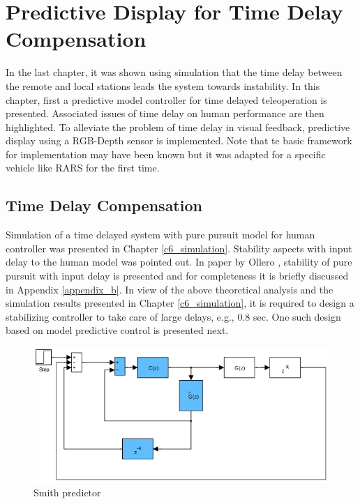 \chapter{ Predictive Display for Time Delay Compensation}
\label{ch_7:PDsply}
In the last chapter, it was shown using simulation that the time delay between the remote and local stations leads the system towards instability. In this chapter, first a predictive model controller for time delayed teleoperation is presented. Associated issues of time delay on human performance are then highlighted. To alleviate the problem of time delay in visual feedback, predictive display using a RGB-Depth sensor is  implemented. Note that te basic framework for implementation may have been known but it was adapted for a specific vehicle like RARS for the first time. 

\section {Time Delay Compensation}
Simulation of a time delayed system with pure pursuit model for human controller was presented in Chapter \ref{c6_simulation}.  Stability aspects with input delay to the human model was pointed out. In paper by Ollero \cite{ollero1995stability}, stability of pure pursuit with input delay is presented and for completeness it is briefly discussed in Appendix \ref{appendix_b}.   In view of the above theoretical analysis and the simulation results presented in Chapter \ref{c6_simulation}, it is required to design  a stabilizing controller to take care of large delays, e.g.,  0.8 sec. One such design based on model  predictive control is presented next.

 \begin{figure}
 	\includegraphics[width=\linewidth]{Chapter7/fig/Smith_predictor}
 	\caption{Smith predictor \cite{smith1959controller}}
 	\label{fig:Smith}
 \end{figure}
 
